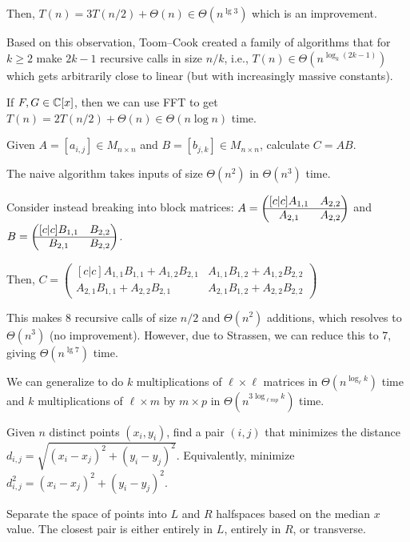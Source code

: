 Then, $T(n) = 3T(n/2) + \Theta(n) \in \Theta(n^{\lg 3})$ which is an improvement.

Based on this observation, Toom--Cook created a family of algorithms
that for $k \geq 2$ make $2k-1$ recursive calls in size $n/k$,
i.e., $T(n) \in \Theta(n^{\log_k(2k-1)})$ which gets arbitrarily close to linear
(but with increasingly massive constants).

If $F,G \in \mathbb{C}[x]$, then we can use FFT to get $T(n) = 2T(n/2)+\Theta(n) \in \Theta(n\log n)$ time.

\begin{problem}
Given $A = [a_{i,j}] \in M_{n\times n}$ and $B = [b_{j,k}] \in M_{n \times n}$,
calculate $C = AB$.
\end{problem}

The naive algorithm takes inputs of size $\Theta(n^2)$ in $\Theta(n^3)$ time.

Consider instead breaking into block matrices:
$A = \pmqty[c|c]{A_{1,1}&A_{2,2}\\\hline A_{2,1}&A_{2,2}}$ and
$B = \pmqty[c|c]{B_{1,1}&B_{2,2}\\\hline B_{2,1}&B_{2,2}}$.

Then, $C = \begin{pmatrix}[c|c]
    A_{1,1}B_{1,1} + A_{1,2}B_{2,1} & A_{1,1}B_{1,2} + A_{1,2}B_{2,2} \\ \hline
    A_{2,1}B_{1,1} + A_{2,2}B_{2,1} & A_{2,1}B_{1,2} + A_{2,2}B_{2,2}
  \end{pmatrix}$

This makes 8 recursive calls of size $n/2$ and $\Theta(n^2)$ additions,
which resolves to $\Theta(n^3)$ (no improvement).
However, due to Strassen, we can reduce this to 7, giving $\Theta(n^{\lg 7})$ time.

We can generalize to do $k$ multiplications of $\ell\times\ell$ matrices in $\Theta(n^{\log_\ell k})$ time
and $k$ multiplications of $\ell\times m$ by $m\times p$ in $\Theta(n^{3\log_{\ell m p}k})$ time.

\begin{problem}
Given $n$ distinct points $(x_i, y_i)$,
find a pair $(i,j)$ that minimizes the distance $d_{i,j} = \sqrt{(x_i-x_j)^2+(y_i-y_j)^2}$.
Equivalently, minimize $d^2_{i,j} = (x_i-x_j)^2+(y_i-y_j)^2$.
\end{problem}

Separate the space of points into $L$ and $R$ halfspaces based on the median $x$ value.
The closest pair is either entirely in $L$, entirely in $R$, or transverse.


